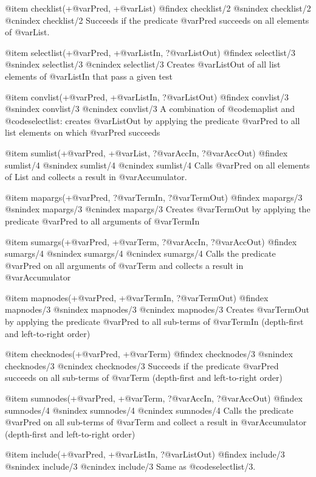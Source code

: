 {{{{{{{{@item checklist(+@var{Pred}, +@var{List})
@findex checklist/2
@snindex checklist/2
@cnindex checklist/2
      Succeeds if the predicate @var{Pred} succeeds on all elements of @var{List}.

@item selectlist(+@var{Pred}, +@var{ListIn}, ?@var{ListOut})
@findex selectlist/3
@snindex selectlist/3
@cnindex selectlist/3
      Creates @var{ListOut} of all list elements of @var{ListIn} that pass a given test

@item convlist(+@var{Pred}, +@var{ListIn}, ?@var{ListOut})
@findex convlist/3
@snindex convlist/3
@cnindex convlist/3
      A combination of @code{maplist} and @code{selectlist}: creates @var{ListOut} by
applying the predicate @var{Pred} to all list elements on which
@var{Pred} succeeds

@item sumlist(+@var{Pred}, +@var{List}, ?@var{AccIn}, ?@var{AccOut})
@findex sumlist/4
@snindex sumlist/4
@cnindex sumlist/4
      Calls @var{Pred} on all elements of List and collects a result in
@var{Accumulator}.

@item mapargs(+@var{Pred}, ?@var{TermIn}, ?@var{TermOut})
@findex mapargs/3
@snindex mapargs/3
@cnindex mapargs/3
      Creates @var{TermOut} by applying the predicate @var{Pred} to all
      arguments of @var{TermIn}

@item sumargs(+@var{Pred}, +@var{Term}, ?@var{AccIn}, ?@var{AccOut})
@findex sumargs/4
@snindex sumargs/4
@cnindex sumargs/4
  Calls the predicate @var{Pred} on all arguments of @var{Term} and
collects a  result in @var{Accumulator}

@item mapnodes(+@var{Pred}, +@var{TermIn}, ?@var{TermOut}) 
@findex mapnodes/3
@snindex mapnodes/3
@cnindex mapnodes/3
      Creates @var{TermOut} by applying the predicate @var{Pred}
      to all sub-terms of @var{TermIn} (depth-first and left-to-right order)

@item checknodes(+@var{Pred}, +@var{Term}) 
@findex checknodes/3
@snindex checknodes/3
@cnindex checknodes/3
      Succeeds if the predicate @var{Pred} succeeds on all sub-terms of
      @var{Term} (depth-first and left-to-right order)

@item sumnodes(+@var{Pred}, +@var{Term}, ?@var{AccIn}, ?@var{AccOut})
@findex sumnodes/4
@snindex sumnodes/4
@cnindex sumnodes/4
      Calls the predicate @var{Pred} on all sub-terms of @var{Term} and
collect a result in @var{Accumulator} (depth-first and left-to-right
order)

@item include(+@var{Pred}, +@var{ListIn}, ?@var{ListOut})
@findex include/3
@snindex include/3
@cnindex include/3
      Same as @code{selectlist/3}.

}}}}}}}}
